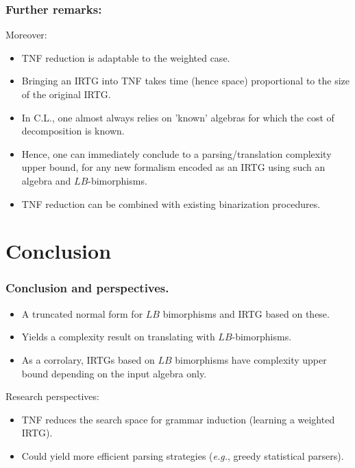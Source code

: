 \documentclass{beamer}
\begin{document}
\begin{frame}
  \frametitle{Further remarks:}
Moreover:
\begin{itemize}
\item TNF reduction is adaptable to the weighted case.
\item Bringing an IRTG into TNF takes time (hence space) proportional to the size of the original IRTG.
\item In C.L., one almost always relies on 'known' algebras for which the cost of decomposition is known.
\item Hence, one can immediately conclude to a parsing/translation complexity upper bound, for any new formalism encoded as an IRTG using such an algebra and $LB$-bimorphisms.
\item TNF reduction can be combined with existing binarization procedures. 
\end{itemize}
\end{frame}



\section{Conclusion}

\begin{frame}
  \frametitle{Conclusion and perspectives.}
  \begin{itemize}
  \item A truncated normal form for $LB$ bimorphisms and IRTG based on these.
  \item Yields a complexity result on translating with $LB$-bimorphisms.
  \item As a corrolary, IRTGs based on $LB$ bimorphisms have complexity upper bound depending on the input algebra only.
  \end{itemize}

  Research perspectives:
  \begin{itemize}
  \item TNF reduces the search space for grammar induction (learning a weighted IRTG).
  \item Could yield more efficient parsing strategies (\emph{e.g.}, greedy statistical parsers).
  \end{itemize}
\end{frame}
 
\end{document}
